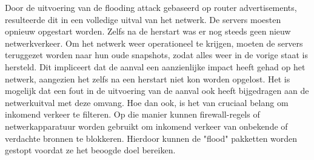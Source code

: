 Door de uitvoering van de flooding attack gebaseerd op router advertisements, resulteerde dit in een volledige uitval van het netwerk. De servers moesten opnieuw opgestart worden. Zelfs na de herstart was er nog steeds geen nieuw netwerkverkeer. Om het netwerk weer operationeel te krijgen, moeten de servers teruggezet worden naar hun oude snapshots, zodat alles weer in de vorige staat is hersteld. Dit impliceert dat de aanval een aanzienlijke impact heeft gehad op het netwerk, aangezien het zelfs na een herstart niet kon worden opgelost. Het is mogelijk dat een fout in de uitvoering van de aanval ook heeft bijgedragen aan de netwerkuitval met deze omvang. Hoe dan ook, is het van cruciaal belang om inkomend verkeer te filteren. Op die manier kunnen firewall-regels of netwerkapparatuur worden gebruikt om inkomend verkeer van onbekende of verdachte bronnen te blokkeren. Hierdoor kunnen de "flood" pakketten worden gestopt voordat ze het beoogde doel bereiken.
